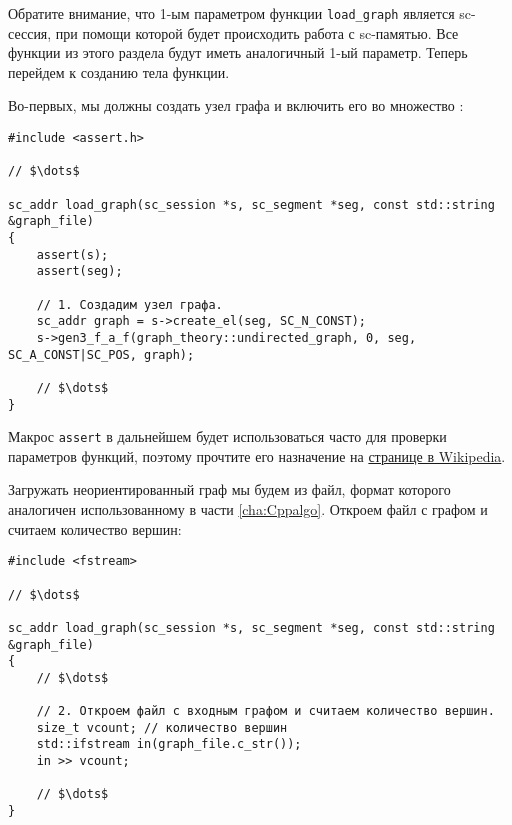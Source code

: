 Обратите внимание, что 1-ым параметром функции \lstinline|load_graph|
является sc-сессия, при помощи которой будет происходить работа с
sc-памятью. Все функции из этого раздела будут иметь аналогичный 1-ый
параметр. Теперь перейдем к созданию тела функции.

Во-первых, мы должны создать узел графа и включить его во множество
:
\begin{lstlisting}[texcl]
#include <assert.h>

// $\dots$

sc_addr load_graph(sc_session *s, sc_segment *seg, const std::string &graph_file)
{
    assert(s);
    assert(seg);

    // 1. Создадим узел графа.
    sc_addr graph = s->create_el(seg, SC_N_CONST);
    s->gen3_f_a_f(graph_theory::undirected_graph, 0, seg, SC_A_CONST|SC_POS, graph);

    // $\dots$
}
\end{lstlisting}

Макрос \lstinline|assert| в дальнейшем будет использоваться часто для
проверки параметров функций, поэтому прочтите его назначение на
\href{http://ru.wikipedia.org/wiki/Assert}{странице в Wikipedia}.

Загружать неориентированный граф мы будем из файл, формат которого
аналогичен использованному в части \ref{cha:Cppalgo}. Откроем файл с
графом и считаем количество вершин:
\begin{lstlisting}[texcl]
#include <fstream>

// $\dots$

sc_addr load_graph(sc_session *s, sc_segment *seg, const std::string &graph_file)
{
    // $\dots$

    // 2. Откроем файл с входным графом и считаем количество вершин.
    size_t vcount; // количество вершин
    std::ifstream in(graph_file.c_str());
    in >> vcount;

    // $\dots$
}
\end{lstlisting}

